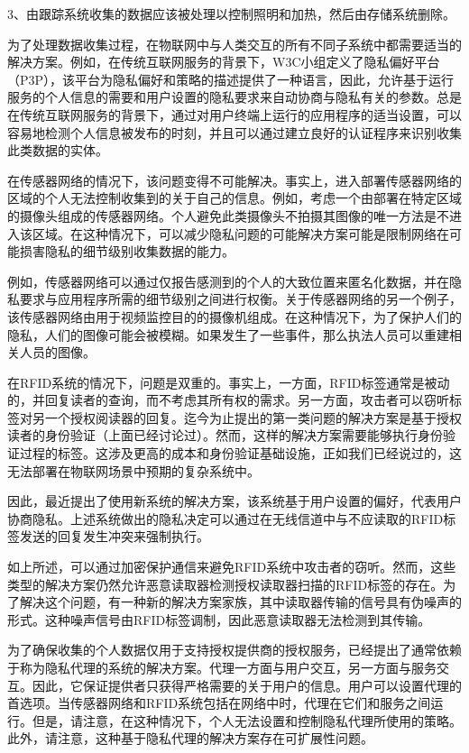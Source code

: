 \documentclass[12pt,a4paper]{article}%
\begin{document}
3、由跟踪系统收集的数据应该被处理以控制照明和加热，然后由存储系统删除。

为了处理数据收集过程，在物联网中与人类交互的所有不同子系统中都需要适当的解决方案。例如，在传统互联网服务的背景下，W3C小组定义了隐私偏好平台（P3P），该平台为隐私偏好和策略的描述提供了一种语言，因此，允许基于运行服务的个人信息的需要和用户设置的隐私要求来自动协商与隐私有关的参数。总是在传统互联网服务的背景下，通过对用户终端上运行的应用程序的适当设置，可以容易地检测个人信息被发布的时刻，并且可以通过建立良好的认证程序来识别收集此类数据的实体。

在传感器网络的情况下，该问题变得不可能解决。事实上，进入部署传感器网络的区域的个人无法控制收集到的关于自己的信息。例如，考虑一个由部署在特定区域的摄像头组成的传感器网络。个人避免此类摄像头不拍摄其图像的唯一方法是不进入该区域。在这种情况下，可以减少隐私问题的可能解决方案可能是限制网络在可能损害隐私的细节级别收集数据的能力。

例如，传感器网络可以通过仅报告感测到的个人的大致位置来匿名化数据，并在隐私要求与应用程序所需的细节级别之间进行权衡。关于传感器网络的另一个例子，该传感器网络由用于视频监控目的的摄像机组成。在这种情况下，为了保护人们的隐私，人们的图像可能会被模糊。如果发生了一些事件，那么执法人员可以重建相关人员的图像。

在RFID系统的情况下，问题是双重的。事实上，一方面，RFID标签通常是被动的，并回复读者的查询，而不考虑其所有权的需求。另一方面，攻击者可以窃听标签对另一个授权阅读器的回复。迄今为止提出的第一类问题的解决方案是基于授权读者的身份验证（上面已经讨论过）。然而，这样的解决方案需要能够执行身份验证过程的标签。这涉及更高的成本和身份验证基础设施，正如我们已经说过的，这无法部署在物联网场景中预期的复杂系统中。

因此，最近提出了使用新系统的解决方案，该系统基于用户设置的偏好，代表用户协商隐私。上述系统做出的隐私决定可以通过在无线信道中与不应读取的RFID标签发送的回复发生冲突来强制执行。

如上所述，可以通过加密保护通信来避免RFID系统中攻击者的窃听。然而，这些类型的解决方案仍然允许恶意读取器检测授权读取器扫描的RFID标签的存在。为了解决这个问题，有一种新的解决方案家族，其中读取器传输的信号具有伪噪声的形式。这种噪声信号由RFID标签调制，因此恶意读取器无法检测到其传输。

为了确保收集的个人数据仅用于支持授权提供商的授权服务，已经提出了通常依赖于称为隐私代理的系统的解决方案。代理一方面与用户交互，另一方面与服务交互。因此，它保证提供者只获得严格需要的关于用户的信息。用户可以设置代理的首选项。当传感器网络和RFID系统包括在网络中时，代理在它们和服务之间运行。但是，请注意，在这种情况下，个人无法设置和控制隐私代理所使用的策略。此外，请注意，这种基于隐私代理的解决方案存在可扩展性问题。
\end{document}
